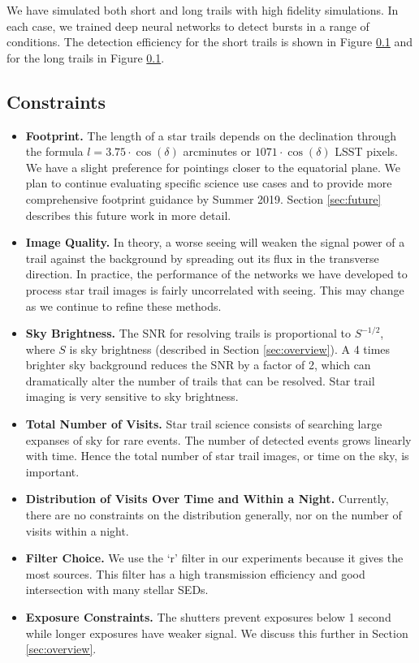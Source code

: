 \documentclass[12pt, letterpaper]{article}
\begin{document}
We have simulated both short and long trails with high fidelity simulations. In each case, we trained deep neural networks to detect bursts in a range of conditions. The detection efficiency for the short trails is shown in Figure \ref{} and for the long trails in Figure \ref{}. 

\subsection{Constraints}

\begin{itemize}
\item \textbf{Footprint.} The length of a star trails depends on the declination through the formula $l = 3.75 \cdot \cos(\delta)$ arcminutes or $1071 \cdot \cos(\delta)$ LSST pixels. We have a slight preference for pointings closer to the equatorial plane. We plan to continue evaluating specific science use cases and to provide more comprehensive footprint guidance by Summer 2019. Section \ref{sec:future} describes this future work in more detail.

\item \textbf{Image Quality.} In theory, a worse seeing will weaken the signal power of a trail against the background by spreading out its flux in the transverse direction. In practice, the performance of the networks we have developed to process star trail images is fairly uncorrelated with seeing. This may change as we continue to refine these methods.

\item \textbf{Sky Brightness.} The SNR for resolving trails is proportional to $S^{-1/2}$, where $S$ is sky brightness (described in Section \ref{sec:overview}). A 4 times brighter sky background reduces the SNR by a factor of 2, which can dramatically alter the number of trails that can be resolved. Star trail imaging is very sensitive to sky brightness. 

\item \textbf{Total Number of Visits.} Star trail science consists of searching large expanses of sky for rare events. The number of detected events grows linearly with time. Hence the total number of star trail images, or time on the sky, is important.

\item \textbf{Distribution of Visits Over Time and Within a Night.} Currently, there are no constraints on the distribution generally, nor on the number of visits within a night.

\item \textbf{Filter Choice.} We use the `r' filter in our experiments because it gives the most sources. This filter has a high transmission efficiency and good intersection with many stellar SEDs.

\item \textbf{Exposure Constraints.} The shutters prevent exposures below 1 second while longer exposures have weaker signal. We discuss this further in Section \ref{sec:overview}.

\end{itemize}
\end{document}
